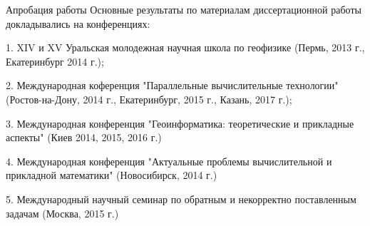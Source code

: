 \documentclass[10pt,pdf, mathserif, hyperref={unicode}]{beamer}
\begin{document}
	
\begin{frame}{Апробация работы}
	Основные результаты по материалам диссертационной работы докладывались на конференциях:
	
	
	1. XIV и XV Уральская молодежная научная школа по геофизике (Пермь, 2013 г., Екатеринбург 2014 г.);
	
	2. Международная коференция "Параллельные вычислительные технологии" (Ростов-на-Дону, 2014 г., Екатеринбург, 2015 г., Казань, 2017 г.);
	
	3. Международная конференция "Геоинформатика: теоретические и прикладные аспекты" (Киев 2014, 2015, 2016 г.)
	
	4. Международная конференция "Актуальные проблемы вычислительной и прикладной математики" (Новосибирск, 2014 г.)
	
	5. Международный научный семинар по обратным и некорректно поставленным задачам (Москва, 2015 г.)
\end{frame}
\end{document}
